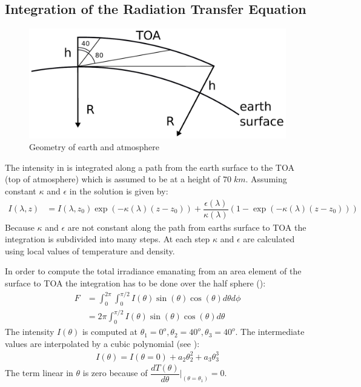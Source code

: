 \subsection{Integration of the Radiation Transfer Equation}

\begin{figure}[ht]
	\includegraphics[width=12cm]{figures/earth_surface_toa.pdf}
	\caption{Geometry of earth and atmosphere}
	\label{fig:geometry}
\end{figure}

The intensity in  is integrated along a path from the earth surface to the TOA (top of atmosphere) which is assumed to be at a height of $70\; km$. Assuming constant $\kappa$ and $\epsilon$ in  the solution is given by:
\begin{align}
	I(\lambda,z) &= I(\lambda,z_0) \exp( -  \kappa(\lambda) (z-z_0)) + \dfrac{\epsilon(\lambda)}{\kappa(\lambda)} \left(1 - \exp( - \kappa(\lambda) (z-z_0))\right)
\end{align}
Because $\kappa$ and $\epsilon$ are not constant along the path from earths surface to TOA the integration is subdivided into many steps. At each step $\kappa$ and $\epsilon$ are calculated using local values of temperature and density.
\newline

In order to compute the total irradiance emanating from an area element of the surface to TOA the integration has to be done over the half sphere ():
\begin{align}
	F &= \int_0^{2 \pi} \int_0^{\pi/2} I(\theta) \sin(\theta) \cos(\theta)  d \theta d \phi \\
	  &= 2 \pi \int_0^{\pi/2} I(\theta) \sin(\theta) \cos(\theta) d \theta
\end{align}
The intensity $I(\theta)$ is computed at $\theta_1=0^o, \theta_2=40^o, \theta_3=40^o$.
The intermediate values are interpolated by a cubic polynomial (see ):
\begin{align}
	I(\theta) = I(\theta=0) + a_2 \theta_2^2 + a_3 \theta_3^3
\end{align}
The term linear in $\theta$ is zero because of $\dfrac{d T(\theta)}{d\theta}|_{(\theta=\theta_1)} = 0$.
\newline

